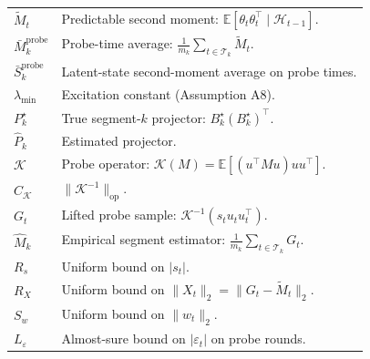 \documentclass[12pt]{article}
\newcommand{\E}{\mathbb{E}}
\newcommand{\op}{\mathrm{op}}
\newcommand{\cH}{\mathcal{H}}
\newcommand{\cT}{\mathcal{T}}
\theoremstyle{plain}
\theoremstyle{definition}
\begin{document}
\begin{appendix}
\begin{center}
\begin{longtable}{l p{}}
$\widetilde{M}_t$ & Predictable second moment: $\E[\theta_t \theta_t^\top \mid \cH_{t-1}]$. \\
$\bar{M}_k^{\mathrm{probe}}$ & Probe-time average: $\frac{1}{m_k}\sum_{t \in \cT_k} \widetilde{M}_t$. \\
$\bar{S}_k^{\mathrm{probe}}$ & Latent-state second-moment average on probe times. \\
$\lambda_{\min}$ & Excitation constant (Assumption A8). \\
$P_k^\star$ & True segment-$k$ projector: $B_k^\star(B_k^\star)^\top$. \\
$\widehat{P}_k$ & Estimated projector. \\

$\mathcal{K}$ & Probe operator: $\mathcal{K}(M) = \E[(u^\top M u) uu^\top]$. \\
$C_{\mathcal{K}}$ & $\|\mathcal{K}^{-1}\|_{\op}$. \\
$G_t$ & Lifted probe sample: $\mathcal{K}^{-1}(s_t u_t u_t^\top)$. \\
$\widehat{M}_k$ & Empirical segment estimator: $\frac{1}{m_k}\sum_{t \in \cT_k} G_t$. \\

$R_s$ & Uniform bound on $|s_t|$. \\
$R_X$ & Uniform bound on $\|X_t\|_2 = \|G_t - \widetilde{M}_t\|_2$. \\
$S_w$ & Uniform bound on $\|w_t\|_2$. \\
$L_\varepsilon$ & Almost-sure bound on $|\varepsilon_t|$ on probe rounds. \\
\end{longtable}
\end{center}



\end{appendix}



\end{document}
